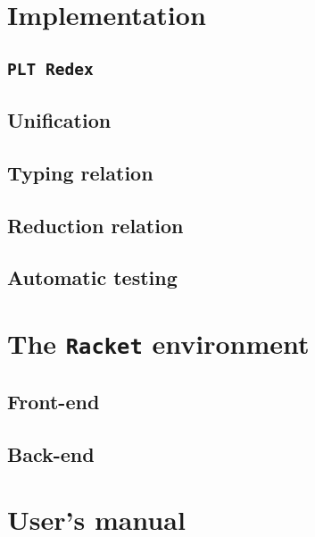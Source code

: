 \documentclass[inz, english, shortabstract]{iithesis}
\newcommand{\Redex}{\texttt{PLT Redex} }
\newcommand{\Racket}{\texttt{Racket} }
\begin{document}
\chapter{Implementation}\label{ch:implementation}

\section{\Redex}

\section{Unification}

\section{Typing relation}

\section{Reduction relation}

\section{Automatic testing}


\chapter{The \Racket environment}\label{ch:racket}

\section{Front-end}

\section{Back-end}

\chapter{User's manual}\label{ch:manual}

\printbibliography

\end{document}
